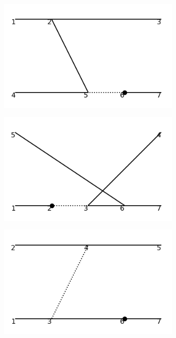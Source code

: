 \documentclass[11pt,a4paper,twoside,pdf]{article}
\numberwithin{equation}{section}
\begin{document}
\begin{figure}[h!]
\begin{subfigure}[t]{0.16\textwidth}
    \end{subfigure}
    \hfill
    \begin{subfigure}[t]{0.16\textwidth}
        \centering
        \includegraphics[width=\textwidth]{plots/order4_2to2/counterterms/22.png}
    \end{subfigure}
    \hfill
    \begin{subfigure}[t]{0.16\textwidth}
        \centering
        \includegraphics[width=\textwidth]{plots/order4_2to2/counterterms/23.png}
    \end{subfigure}
    \hfill
    \begin{subfigure}[t]{0.16\textwidth}
        \centering
        \includegraphics[width=\textwidth]{plots/order4_2to2/counterterms/24.png}

\end{subfigure}
\end{figure}
\end{document}
